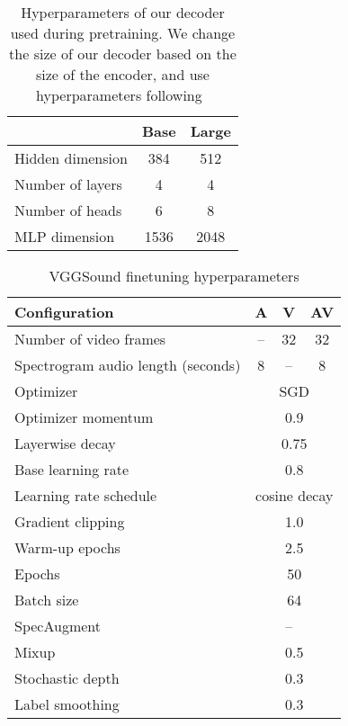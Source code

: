 \documentclass[10pt,twocolumn,letterpaper]{article}
\begin{document}
\begin{table}[t]  
	\caption{Hyperparameters of our decoder used during pretraining. We change the size of our decoder based on the size of the encoder, and use hyperparameters following~\cite{he2022masked, feichtenhofer2022masked, tong2022videomae}}
	\centering
	\vspace{-0.6\baselineskip}
	\begin{tabular}{lcc}
		\toprule
		&  Base  & Large   \\ \midrule 
		Hidden dimension   &  384 & 512 \\
		Number of layers    &  4 & 4 \\
		Number of heads     &  6 & 8 \\   
		MLP dimension       & 1536  & 2048 \\ 
		\bottomrule
	\end{tabular}
	\label{tab:hyperparams_decoder}
\end{table} 

\begin{table}[t] 
	\caption{VGGSound finetuning hyperparameters}
	\vspace{-0.6\baselineskip}
	\centering
		\begin{tabular}{lccc}
			\toprule  
			Configuration        & A & V & AV \\
			\midrule
			Number of video frames     & -- & 32 & 32\\
			Spectrogram audio length (seconds)    & 8 & -- & 8  \\
			\midrule
			Optimizer              &  \multicolumn{3}{c}{SGD}  \\
			Optimizer momentum        &  \multicolumn{3}{c}{0.9} \\
			Layerwise decay~\cite{bao2021beit,clark2020electra}    &  \multicolumn{3}{c}{0.75} \\
			Base learning rate          & \multicolumn{3}{c}{0.8} \\
			Learning rate schedule     & \multicolumn{3}{c}{cosine decay}\\
			Gradient clipping        & \multicolumn{3}{c}{1.0}    \\  
			Warm-up epochs          & \multicolumn{3}{c}{2.5} \\
			Epochs                 & \multicolumn{3}{c}{50} \\
			Batch size             & \multicolumn{3}{c}{64} \\
			\midrule 
		    SpecAugment \cite{park2019specaugment}   & \checkmark  & -- & \checkmark \\
			Mixup  \cite{zhang_mixup_iclr_2018}           &   \multicolumn{3}{c}{0.5} \\
			Stochastic depth  \cite{huang_stochasticdepth_eccv_2016}    &  \multicolumn{3}{c}{0.3}   \\
			Label smoothing  \cite{szegedy_cvpr_2016}          &  \multicolumn{3}{c}{0.3}   \\
			\bottomrule
		\end{tabular}
		\label{tab:hyperparams_vggsound}
\end{table}
\end{document}
